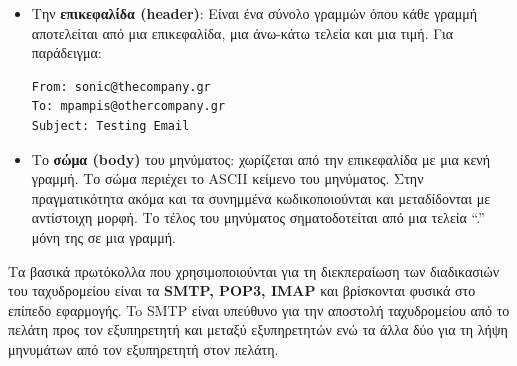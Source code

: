 \begin{itemize}
\item Την \textbf{επικεφαλίδα (header)}: Είναι ένα σύνολο γραμμών όπου κάθε γραμμή αποτελείται από μια επικεφαλίδα, μια άνω-κάτω τελεία και μια τιμή. Για παράδειγμα:

\begin{verbatim}
From: sonic@thecompany.gr
To: mpampis@othercompany.gr
Subject: Testing Email
\end{verbatim}

\item Το \textbf{σώμα (body)} του μηνύματος: χωρίζεται από την επικεφαλίδα με μια κενή γραμμή. Το σώμα περιέχει το ASCII κείμενο του μηνύματος. Στην πραγματικότητα ακόμα και τα συνημμένα κωδικοποιούνται και μεταδίδονται με αντίστοιχη μορφή. Το τέλος του μηνύματος σηματοδοτείται από μια τελεία ``.'' μόνη της σε μια γραμμή.
\end{itemize}

Τα βασικά πρωτόκολλα που χρησιμοποιούνται για τη διεκπεραίωση των διαδικασιών του ταχυδρομείου είναι τα \textbf{SMTP, POP3, IMAP} και βρίσκονται φυσικά στο επίπεδο εφαρμογής. To SMTP είναι υπεύθυνο για την αποστολή ταχυδρομείου από το πελάτη προς τον εξυπηρετητή και μεταξύ εξυπηρετητών ενώ τα άλλα δύο για τη λήψη μηνυμάτων από τον εξυπηρετητή στον πελάτη.

